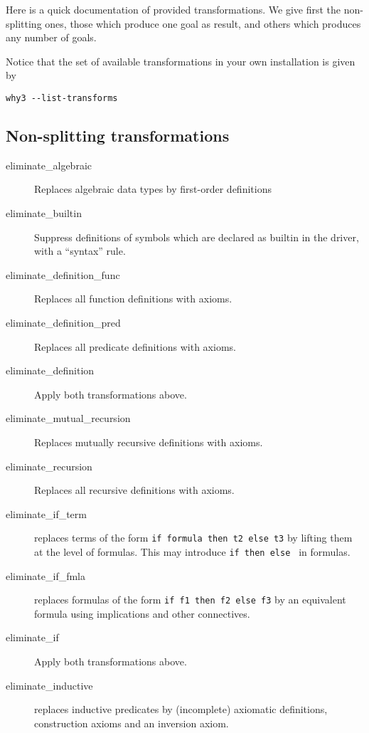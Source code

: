 Here is a quick documentation of provided transformations. We give
first the non-splitting ones, \eg{} those which produce one goal as
result, and others which produces any number of goals.

Notice that the set of available transformations in your own
installation is given by
\begin{verbatim}
why3 --list-transforms
\end{verbatim}

\subsection{Non-splitting transformations}

\begin{description}

\item[eliminate\_algebraic] Replaces algebraic data types by first-order
definitions~\cite{paskevich09rr}

\item[eliminate\_builtin] Suppress definitions of symbols which are
  declared as builtin in the driver, \ie with a ``syntax'' rule.
\item[eliminate\_definition\_func]
  Replaces all function definitions with axioms.
\item[eliminate\_definition\_pred]
  Replaces all predicate definitions with axioms.
\item[eliminate\_definition]
  Apply both transformations above.
\item[eliminate\_mutual\_recursion]
  Replaces mutually recursive definitions with axioms.
\item[eliminate\_recursion]
  Replaces all recursive definitions with axioms.

\item[eliminate\_if\_term] replaces terms of the form \texttt{if
    formula then t2 else t3} by lifting them at the level of formulas.
  This may introduce \texttt{if then else } in formulas.

\item[eliminate\_if\_fmla] replaces formulas of the form \texttt{if f1 then f2
  else f3} by an equivalent formula using implications and other
  connectives.

\item[eliminate\_if]
  Apply both transformations above.

\item[eliminate\_inductive] replaces inductive predicates by
  (incomplete) axiomatic definitions, \ie construction axioms and
  an inversion axiom.


\end{description}

